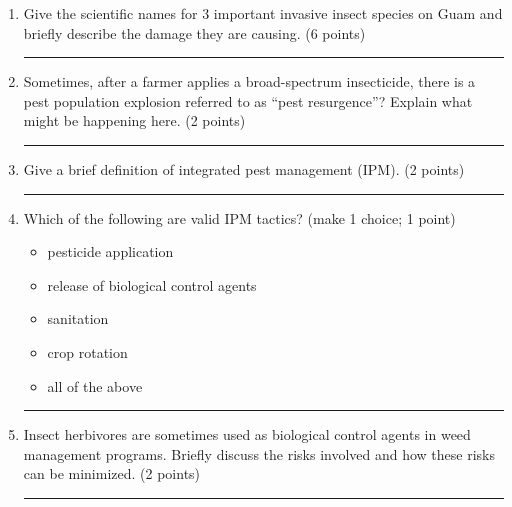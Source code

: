 \documentclass[letter,12pt]{scrartcl}
\begin{document}
\begin{enumerate}
		\pagebreak
		
		\item Give the scientific names for 3 important invasive insect species on Guam and briefly describe the damage they are causing. (6 points)
		\vspace{1in}\hrule
		
%		
		
		\item Sometimes, after a farmer applies a broad-spectrum insecticide, there is a pest population explosion referred to as “pest resurgence”? Explain what might be happening here. (2 points)
		\vspace{1in}\hrule
		
		\item Give a brief definition of integrated pest management (IPM). (2 points)
		\vspace{1in}\hrule
		
		\item Which of the following are valid IPM tactics? (make 1 choice; 1 point)
		\begin{itemize}
			\item pesticide application
			\item release of biological control agents
			\item sanitation
			\item crop rotation
			\item all of the above
		\end{itemize}
		\bigskip\hrule
				
		\item Insect herbivores are sometimes used as biological control agents in weed management programs. Briefly discuss the risks involved and how these risks can be minimized. (2 points)
		\vspace{1in}\hrule
		

\end{enumerate}
\end{document}
